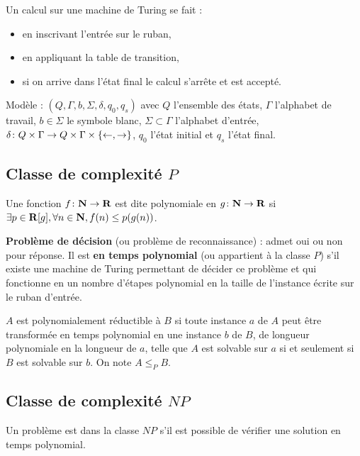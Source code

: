 \documentclass[a4paper,11pt,twocolumn]{article}
\begin{document}
	Un calcul sur une machine de Turing se fait :
	\begin{itemize}
	\item en inscrivant l'entrée sur le ruban,
	\item en appliquant la table de transition,
	\item si on arrive dans l'état final le calcul s'arrête et est accepté.
	\end{itemize}

	Modèle : $(Q,\Gamma,b,\Sigma,\delta,q_0,q_s)$ avec $Q$ l'ensemble des états, $\Gamma$ l'alphabet de travail, $b \in \Sigma$ le symbole blanc, $\Sigma \subset \Gamma$ l'alphabet d'entrée, $\delta \colon Q \times \Gamma \to Q \times \Gamma \times \{ \leftarrow, \rightarrow \}$, $q_0$ l'état initial et $q_s$ l'état final.

	\subsection{Classe de complexité $P$}

		\begin{defn}
		Une fonction $f \colon \mathbf{N} \to \mathbf{R}$ est dite polynomiale en $g \colon \mathbf{N} \to \mathbf{R}$ si $\exists p \in \mathbf{R}[g], \forall n \in \mathbf{N}, f(n) \leq p(g(n))$.
		\end{defn}

		\begin{defn}
		\textbf{Problème de décision} (ou problème de reconnaissance) : admet oui ou non pour réponse.
		Il est \textbf{en temps polynomial} (ou appartient à la classe $P$) s'il existe une machine de Turing permettant de décider ce problème et qui fonctionne en un nombre d'étapes polynomial en la taille de l'instance écrite sur le ruban d'entrée.
		\end{defn}

		\begin{note}
		$A$ est polynomialement réductible à $B$ si toute instance $a$ de $A$ peut être transformée en temps polynomial en une instance $b$ de $B$, de longueur polynomiale en la longueur de $a$, telle que $A$ est solvable sur $a$ si et seulement si $B$ est solvable sur $b$.
		On note $A \leq_P B$.
		\end{note}

	\subsection{Classe de complexité $NP$}

		\begin{defn}
		Un problème est dans la classe $NP$ s'il est possible de vérifier une solution en temps polynomial.
		\end{defn}
		
\end{document}

